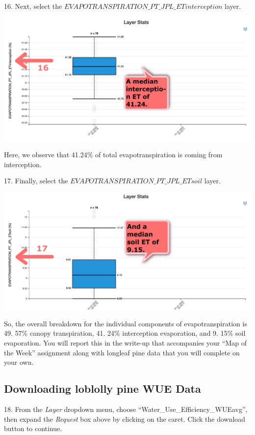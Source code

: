 \documentclass[oneside,a4paper,11pt,explicit]{book}
\begin{document}
16. Next, select the $EVAPOTRANSPIRATION\_PT\_JPL\_ETinterception$ layer. 

\vspace{.5em}

\centerline{\includegraphics[width=.6\textwidth]{ETComponents2.png}}

\vspace{.5em}

Here, we observe that 41.24\% of total evapotranspiration is coming from interception.

17. Finally, select the $EVAPOTRANSPIRATION\_PT\_JPL\_ETsoil$ layer.

\vspace{.5em}

\centerline{\includegraphics[width=.6\textwidth]{ETComponents3.png}}

\vspace{.5em}

So, the overall breakdown for the individual components of evapotranspiration is 49. 57\% canopy transpiration, 41. 24\% interception evaporation, and 9. 15\% soil evaporation. You will report this in the write-up that accompanies your ``Map of the Week'' assignment along with longleaf pine data that you will complete on your own. 

\subsection{Downloading loblolly pine WUE Data}

18. From the \textit{Layer} dropdown menu, choose ``Water\_Use\_Efficiency\_WUEavg'', then expand the \textit{Request} box above by clicking on the caret. Click the download button to continue.
\end{document}
